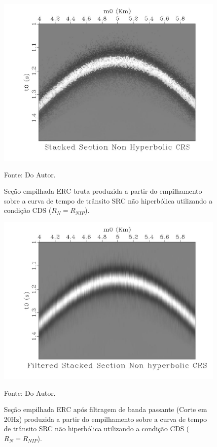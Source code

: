 \begin{figure}
\caption{Seção empilhada ERC bruta produzida a partir do empilhamento sobre a curva de tempo de trânsito SRC não hiperbólica
utilizando a condição CDS ($R_N=R_{NIP}$).}
\begin{center}
\includegraphics[scale=0.4]{images/stackedSectionNcrs.jpeg}
\vspace{-0.3cm}
\end{center}
\begin{center}
 Fonte: Do Autor.
\end{center}
\label{fig:7.9}
\end{figure}

\begin{figure}
\caption{Seção empilhada ERC após filtragem de banda passante (Corte em 20Hz) produzida a partir do empilhamento 
sobre a curva de tempo de trânsito SRC não hiperbólica
utilizando a condição CDS ($R_N=R_{NIP}$).}
\begin{center}
\includegraphics[scale=0.4]{images/filteredStackedSectionNcrs.jpeg}
\vspace{-0.3cm}
\end{center}
\begin{center}
 Fonte: Do Autor.
\end{center}
\label{fig:7.10}
\end{figure}
